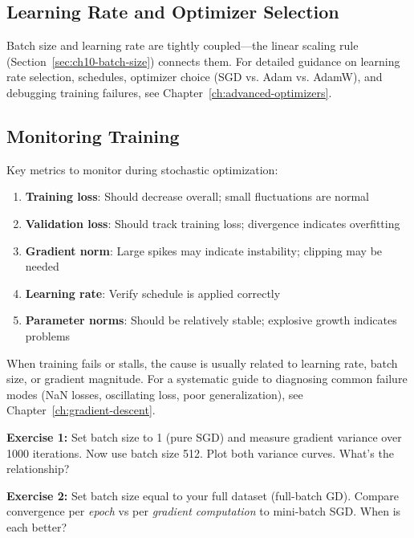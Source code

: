 \documentclass[../../main.tex]{subfiles}
\begin{document}
\subsection{Learning Rate and Optimizer Selection}

Batch size and learning rate are tightly coupled---the linear scaling rule (Section~\ref{sec:ch10-batch-size}) connects them. For detailed guidance on learning rate selection, schedules, optimizer choice (SGD vs. Adam vs. AdamW), and debugging training failures, see Chapter~\ref{ch:advanced-optimizers}.

\subsection{Monitoring Training}

\begin{important}
Key metrics to monitor during stochastic optimization:
\begin{enumerate}
    \item \textbf{Training loss}: Should decrease overall; small fluctuations are normal
    \item \textbf{Validation loss}: Should track training loss; divergence indicates overfitting
    \item \textbf{Gradient norm}: Large spikes may indicate instability; clipping may be needed
    \item \textbf{Learning rate}: Verify schedule is applied correctly
    \item \textbf{Parameter norms}: Should be relatively stable; explosive growth indicates problems
\end{enumerate}
\end{important}

\begin{keyconcept}
When training fails or stalls, the cause is usually related to learning rate, batch size, or gradient magnitude. For a systematic guide to diagnosing common failure modes (NaN losses, oscillating loss, poor generalization), see Chapter~\ref{ch:gradient-descent}.
\end{keyconcept}

\begin{whatbreaks}
\textbf{Exercise 1:} Set batch size to 1 (pure SGD) and measure gradient variance over 1000 iterations. Now use batch size 512. Plot both variance curves. What's the relationship?

\textbf{Exercise 2:} Set batch size equal to your full dataset (full-batch GD). Compare convergence per \textit{epoch} vs per \textit{gradient computation} to mini-batch SGD. When is each better?
\end{whatbreaks}
\end{document}
